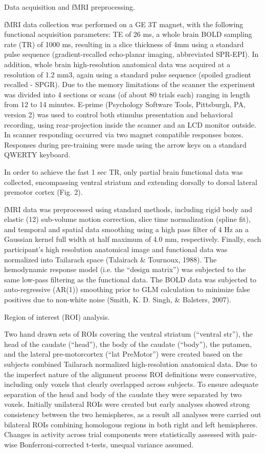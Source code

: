 Data acquisition and fMRI preprocessing. 

fMRI data collection was performed on a GE 3T magnet, with the following functional acquisition parameters: TE of 26 ms, a whole brain BOLD sampling rate (TR) of 1000 ms, resulting in a slice thickness of 4mm using a standard pulse sequence (gradient-recalled echo-planar imaging, abbreviated SPR-EPI).  In addition, whole brain high-resolution anatomical data was acquired at a resolution of 1.2 mm3, again using a standard pulse sequence (spoiled gradient recalled - SPGR).  Due to the memory limitations of the scanner the experiment was divided into 4 sections or scans (of about 80 trials each) ranging in length from 12 to 14 minutes.  E-prime (Psychology Software Tools, Pittsburgh, PA, version 2) was used to control both stimulus presentation and behavioral recording, using rear-projection inside the scanner and an LCD monitor outside. In scanner responding occurred via two magnet compatible responses boxes.  Responses during pre-training were made using the arrow keys on a standard QWERTY keyboard.

In order to achieve the fast 1 sec TR, only partial brain functional data was collected, encompassing ventral striatum and extending dorsally to dorsal lateral premotor cortex (Fig. 2).  

fMRI data was preprocessed using standard methods, including rigid body and elastic (12) sub-volume motion correction, slice time normalization (spline fit), and temporal and spatial data smoothing using a high pass filter of 4 Hz an a Gaussian kernel full width at half maximum of 4.0 mm, respectively.   Finally, each participant’s high resolution anatomical image and functional data was normalized into Tailarach space (Talairach & Tournoux, 1988).  The hemodynamic response model (i.e. the “design matrix”) was subjected to the same low-pass filtering as the functional data.  The BOLD data was subjected to auto-regressive (AR(1)) smoothing prior to GLM calculation to minimize false positives due to non-white noise (Smith, K. D. Singh, & Balsters, 2007).



 Region of interest (ROI) analysis.  

Two hand drawn sets of ROIs covering the ventral striatum (“ventral str”), the head of the caudate (“head”), the body of the caudate (“body”), the putamen, and the lateral pre-motorcortex (“lat PreMotor”) were created based on the subjects combined Tailarach normalized high-resolution anatomical data.  Due to the imperfect nature of the alignment process ROI definitions were conservative, including only voxels that clearly overlapped across subjects. To ensure adequate separation of the head and body of the caudate they were separated by two voxels. Initially unilateral ROIs were created but early analyses showed strong consistency between the two hemispheres, as a result all analyses were carried out bilateral ROIs combining homologous regions in both right and left hemispheres.  Changes in activity across trial components were statistically assessed with pair-wise Bonferroni-corrected t-tests, unequal variance assumed.



